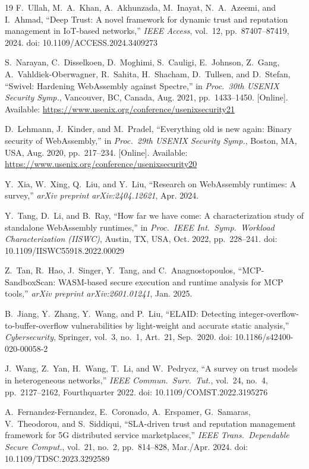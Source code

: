 \documentclass[conference]{IEEEtran}
\begin{document}
\begin{thebibliography}{19}
F.~Ullah, M.~A.~Khan, A.~Akhunzada, M.~Inayat, N.~A.~Azeemi,
and I.~Ahmad,
``Deep Trust: A novel framework for dynamic trust and reputation
management in {IoT}-based networks,''
\emph{IEEE Access}, vol.~12, pp.~87407--87419, 2024.
doi: 10.1109/ACCESS.2024.3409273

S.~Narayan, C.~Disselkoen, D.~Moghimi, S.~Cauligi, E.~Johnson,
Z.~Gang, A.~Vahldiek-Oberwagner, R.~Sahita, H.~Shacham,
D.~Tullsen, and D.~Stefan,
``Swivel: Hardening {WebAssembly} against {Spectre},''
in \emph{Proc.\ 30th USENIX Security Symp.}, Vancouver, BC,
Canada, Aug. 2021, pp.~1433--1450.
[Online]. Available: \url{https://www.usenix.org/conference/usenixsecurity21}

D.~Lehmann, J.~Kinder, and M.~Pradel,
``Everything old is new again: Binary security of {WebAssembly},''
in \emph{Proc.\ 29th USENIX Security Symp.}, Boston, MA, USA,
Aug. 2020, pp.~217--234.
[Online]. Available: \url{https://www.usenix.org/conference/usenixsecurity20}

Y.~Xia, W.~Xing, Q.~Liu, and Y.~Liu,
``Research on {WebAssembly} runtimes: A survey,''
\emph{arXiv preprint arXiv:2404.12621}, Apr. 2024.

Y.~Tang, D.~Li, and B.~Ray,
``How far we have come: A characterization study of standalone
{WebAssembly} runtimes,''
in \emph{Proc.\ IEEE Int.\ Symp.\ Workload Characterization
(IISWC)}, Austin, TX, USA, Oct. 2022, pp.~228--241.
doi: 10.1109/IISWC55918.2022.00029

Z.~Tan, R.~Hao, J.~Singer, Y.~Tang, and C.~Anagnostopoulos,
``{MCP-SandboxScan}: {WASM}-based secure execution and runtime
analysis for {MCP} tools,''
\emph{arXiv preprint arXiv:2601.01241}, Jan. 2025.

B.~Jiang, Y.~Zhang, Y.~Wang, and P.~Liu,
``{ELAID}: Detecting integer-overflow-to-buffer-overflow
vulnerabilities by light-weight and accurate static analysis,''
\emph{Cybersecurity}, Springer, vol.~3, no.~1, Art.\ 21,
Sep.~2020.
doi: 10.1186/s42400-020-00058-2

J.~Wang, Z.~Yan, H.~Wang, T.~Li, and W.~Pedrycz,
``A survey on trust models in heterogeneous networks,''
\emph{IEEE Commun.\ Surv.\ Tut.}, vol.~24, no.~4, pp.~2127--2162,
Fourthquarter 2022.
doi: 10.1109/COMST.2022.3195276

A.~Fernandez-Fernandez, E.~Coronado, A.~Erspamer, G.~Samaras,
V.~Theodorou, and S.~Siddiqui,
``{SLA}-driven trust and reputation management framework for {5G}
distributed service marketplaces,''
\emph{IEEE Trans.\ Dependable Secure Comput.}, vol.~21, no.~2,
pp.~814--828, Mar./Apr. 2024.
doi: 10.1109/TDSC.2023.3292589


\end{thebibliography}
\end{document}
